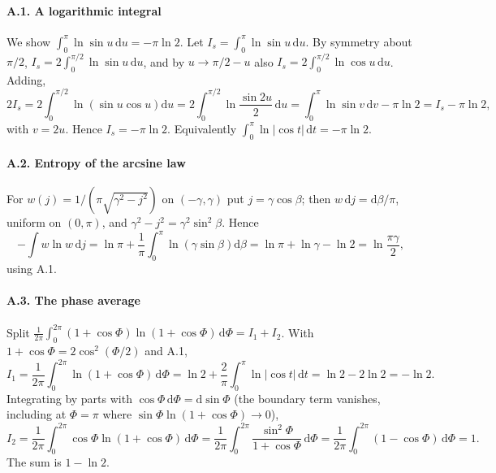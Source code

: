 \documentclass[preprint,12pt]{elsarticle}
\newcommand{\dd}{\mathrm{d}}
\begin{document}
\paragraph{A.1. A logarithmic integral}
We show $\int_{0}^{\pi}\ln\sin u\,\dd u=-\pi\ln2$. Let
$I_{s}=\int_{0}^{\pi}\ln\sin u\,\dd u$. By symmetry about $\pi/2$,
$I_{s}=2\int_{0}^{\pi/2}\ln\sin u\,\dd u$, and by $u\to\pi/2-u$ also
$I_{s}=2\int_{0}^{\pi/2}\ln\cos u\,\dd u$. Adding,
\begin{equation}
2I_{s}=2\int_{0}^{\pi/2}\ln\left(\sin u\cos u\right)\dd u
=2\int_{0}^{\pi/2}\ln\frac{\sin2u}{2}\,\dd u
=\int_{0}^{\pi}\ln\sin v\,\dd v-\pi\ln2=I_{s}-\pi\ln2,
\end{equation}
with $v=2u$. Hence $I_{s}=-\pi\ln2$. Equivalently
$\int_{0}^{\pi}\ln|\cos t|\,\dd t=-\pi\ln2$.

\paragraph{A.2. Entropy of the arcsine law} For
$w(j)=1/(\pi\sqrt{\gamma^{2}-j^{2}})$ on $(-\gamma,\gamma)$ put
$j=\gamma\cos\beta$; then $w\,\dd j=\dd\beta/\pi$, uniform on $(0,\pi)$, and
$\gamma^{2}-j^{2}=\gamma^{2}\sin^{2}\beta$. Hence
\begin{equation}
-\int w\ln w\,\dd j=\ln\pi+\frac{1}{\pi}\int_{0}^{\pi}\ln\left(\gamma\sin\beta\right)
\dd\beta=\ln\pi+\ln\gamma-\ln2=\ln\frac{\pi\gamma}{2},
\end{equation}
using A.1.

\paragraph{A.3. The phase average} Split
$\frac{1}{2\pi}\int_{0}^{2\pi}(1+\cos\Phi)\ln(1+\cos\Phi)\,\dd\Phi=I_{1}+I_{2}$.
With $1+\cos\Phi=2\cos^{2}(\Phi/2)$ and A.1,
\begin{equation}
I_{1}=\frac{1}{2\pi}\int_{0}^{2\pi}\ln(1+\cos\Phi)\,\dd\Phi
=\ln2+\frac{2}{\pi}\int_{0}^{\pi}\ln|\cos t|\,\dd t=\ln2-2\ln2=-\ln2 .
\end{equation}
Integrating by parts with $\cos\Phi\,\dd\Phi=\dd\sin\Phi$ (the boundary term
vanishes, including at $\Phi=\pi$ where $\sin\Phi\ln(1+\cos\Phi)\to0$),
\begin{equation}
I_{2}=\frac{1}{2\pi}\int_{0}^{2\pi}\cos\Phi\ln(1+\cos\Phi)\,\dd\Phi
=\frac{1}{2\pi}\int_{0}^{2\pi}\frac{\sin^{2}\Phi}{1+\cos\Phi}\,\dd\Phi
=\frac{1}{2\pi}\int_{0}^{2\pi}(1-\cos\Phi)\,\dd\Phi=1 .
\end{equation}
The sum is $1-\ln2$.
\end{document}
